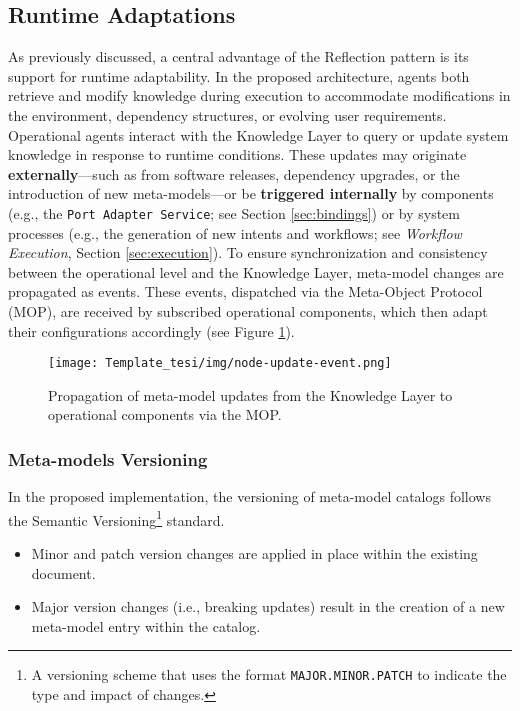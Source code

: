 \subsection{Runtime Adaptations}

As previously discussed, a central advantage of the Reflection pattern is its support for runtime adaptability. In the proposed architecture, agents both retrieve and modify knowledge during execution to accommodate modifications in the environment, dependency structures, or evolving user requirements.
Operational agents interact with the Knowledge Layer to query or update system knowledge in response to runtime conditions. These updates may originate \textbf{externally}—such as from software releases, dependency upgrades, or the introduction of new meta-models—or be \textbf{triggered internally} by components (e.g., the \texttt{Port Adapter Service}; see Section \ref{sec:bindings}) or by system processes (e.g., the generation of new intents and workflows; see \textit{Workflow Execution}, Section \ref{sec:execution}).
To ensure synchronization and consistency between the operational level and the Knowledge Layer, meta-model changes are propagated as events. These events, dispatched via the Meta-Object Protocol (MOP), are received by subscribed operational components, which then adapt their configurations accordingly (see Figure \ref{fig:node-update-event}).


\begin{figure}[h]
    \centering
    \texttt{[image: Template\_tesi/img/node-update-event.png]}
    \caption{Propagation of meta-model updates from the Knowledge Layer to operational components via the MOP.}
    \label{fig:node-update-event} 
\end{figure}


\subsubsection{Meta-models Versioning}
In the proposed implementation, the versioning of meta-model catalogs follows the Semantic Versioning\footnote{A versioning scheme that uses the format \texttt{MAJOR.MINOR.PATCH} to indicate the type and impact of changes.} standard.


\begin{itemize}[leftmargin=*, label=--] 
    \item Minor and patch version changes are applied in place within the existing document.
    \item Major version changes (i.e., breaking updates) result in the creation of a new meta-model entry within the catalog.

\end{itemize}



